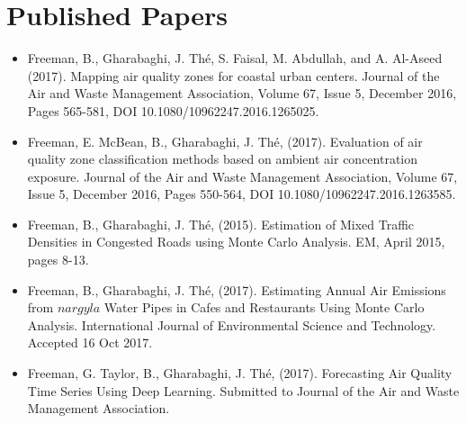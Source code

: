 
\chapter{Published Papers}

\begin{itemize}

\item Freeman, B., Gharabaghi, J.  Th\'e, S. Faisal, M. Abdullah, and A. Al-Aseed (2017). Mapping air quality zones for coastal urban centers. Journal of the Air and Waste Management Association, Volume 67, Issue 5, December 2016, Pages 565-581, DOI 10.1080/10962247.2016.1265025.

\item Freeman, E. McBean, B., Gharabaghi, J.  Th\'e, (2017). Evaluation of air quality zone classification methods based on ambient air concentration exposure. Journal of the Air and Waste Management Association, Volume 67, Issue 5, December 2016, Pages 550-564, DOI 10.1080/10962247.2016.1263585.

\item Freeman, B., Gharabaghi, J.  Th\'e, (2015). Estimation of Mixed Traffic Densities in Congested Roads using Monte Carlo Analysis. EM, April 2015, pages 8-13. 

\item Freeman, B., Gharabaghi, J.  Th\'e, (2017). Estimating Annual Air Emissions from $nargyla$ Water Pipes in Cafes and Restaurants Using Monte Carlo Analysis. International Journal of Environmental Science and Technology. Accepted 16 Oct 2017.

\item Freeman, G. Taylor, B., Gharabaghi, J.  Th\'e, (2017). Forecasting Air Quality Time Series Using Deep
Learning. Submitted to Journal of the Air and Waste Management Association.

\end{itemize}

\clearpage
